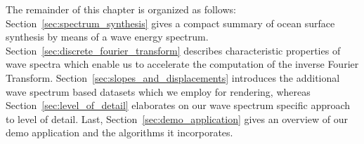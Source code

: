 

%



%
%
%

The remainder of this chapter is organized as follows:
Section~\ref{sec:spectrum_synthesis} gives a compact summary of ocean surface
synthesis by means of a wave energy spectrum.
Section~\ref{sec:discrete_fourier_transform} describes characteristic properties of
wave spectra which enable us to accelerate the computation of the inverse Fourier Transform.
Section~\ref{sec:slopes_and_displacements} introduces the additional wave spectrum
based datasets which we employ for rendering, whereas
Section~\ref{sec:level_of_detail} elaborates on our wave spectrum specific
approach to level of detail. Last, Section~\ref{sec:demo_application} gives an
overview of our demo application and the algorithms it incorporates.

